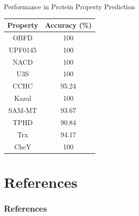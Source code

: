 \documentclass[dvipsnames]{beamer}
\begin{document}
\begin{frame}{Performance in Protein Property Prediction}
	\begin{center}
		\begin{tabular}{cc}\hline
			Property & Accuracy (\%) \\\hline
			OBFD     & 100 \\
			UPF0145  & 100 \\
			NACD     & 100 \\
			U3S      & 100 \\
			CCHC     & 95.24  \\
			Kazal    & 100 \\
			SAM-MT   & 93.67  \\
			TPHD     & 90.84  \\
			Trx      & 94.17  \\
			CheY     & 100 \\\hline
		\end{tabular}
	\end{center}
\end{frame}


\section{References}
\begin{frame}[allowframebreaks]
\frametitle{References}
\printbibliography
\end{frame}
\end{document}
